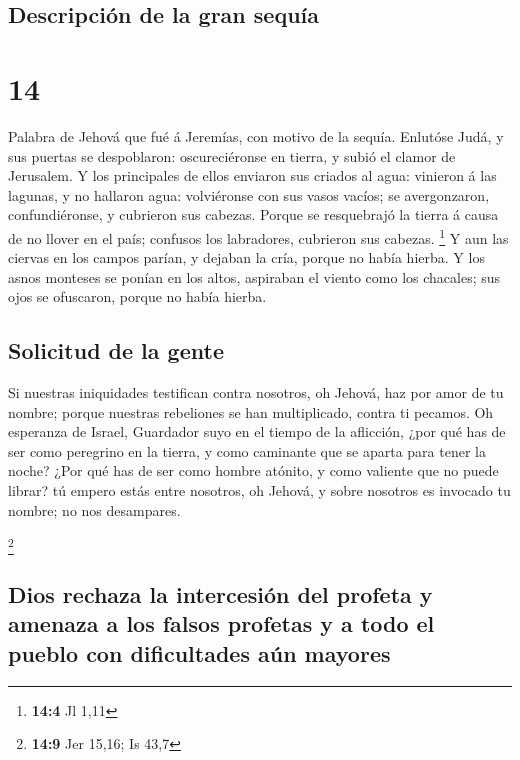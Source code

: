 \hypertarget{descripciuxf3n-de-la-gran-sequuxeda}{%
\subsection{Descripción de la gran
sequía}\label{descripciuxf3n-de-la-gran-sequuxeda}}

\hypertarget{section-13}{%
\section{14}\label{section-13}}

 Palabra de Jehová que fué á Jeremías, con motivo de la
sequía.  Enlutóse Judá, y sus puertas se despoblaron:
oscureciéronse en tierra, y subió el clamor de Jerusalem.  Y
los principales de ellos enviaron sus criados al agua: vinieron á las
lagunas, y no hallaron agua: volviéronse con sus vasos vacíos; se
avergonzaron, confundiéronse, y cubrieron sus cabezas. 
Porque se resquebrajó la tierra á causa de no llover en el país;
confusos los labradores, cubrieron sus cabezas. \footnote{\textbf{14:4}
  Jl 1,11}  Y aun las ciervas en los campos parían, y
dejaban la cría, porque no había hierba.  Y los asnos
monteses se ponían en los altos, aspiraban el viento como los chacales;
sus ojos se ofuscaron, porque no había hierba.

\hypertarget{solicitud-de-la-gente}{%
\subsection{Solicitud de la gente}\label{solicitud-de-la-gente}}

 Si nuestras iniquidades testifican contra nosotros, oh
Jehová, haz por amor de tu nombre; porque nuestras rebeliones se han
multiplicado, contra ti pecamos.  Oh esperanza de Israel,
Guardador suyo en el tiempo de la aflicción, ¿por qué has de ser como
peregrino en la tierra, y como caminante que se aparta para tener la
noche?  ¿Por qué has de ser como hombre atónito, y como
valiente que no puede librar? tú empero estás entre nosotros, oh Jehová,
y sobre nosotros es invocado tu nombre; no nos desampares.

\footnote{\textbf{14:9} Jer 15,16; Is 43,7}

\hypertarget{dios-rechaza-la-intercesiuxf3n-del-profeta-y-amenaza-a-los-falsos-profetas-y-a-todo-el-pueblo-con-dificultades-auxfan-mayores}{%
\subsection{Dios rechaza la intercesión del profeta y amenaza a los
falsos profetas y a todo el pueblo con dificultades aún
mayores}\label{dios-rechaza-la-intercesiuxf3n-del-profeta-y-amenaza-a-los-falsos-profetas-y-a-todo-el-pueblo-con-dificultades-auxfan-mayores}}

